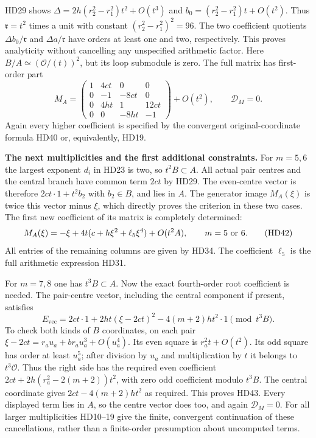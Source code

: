 HD29 shows $\Delta=2h(r_2^2-r_1^2)t^2+O(t^3)$ and
$b_0=(r_2^2-r_1^2)t+O(t^2)$.
Thus $\mathfrak r=t^2$ times a unit with constant
$(r_2^2-r_1^2)^2=96$. The two coefficient quotients
$\Delta b_0/\mathfrak r$ and $\Delta a/\mathfrak r$ have orders
at least one and two, respectively. This proves analyticity
without cancelling any unspecified arithmetic factor.
Here $B/A\simeq(\mathcal O/(t))^2$, but its loop submodule is zero.
The full matrix has first-order part
\[
 M_A=
 \begin{pmatrix}
 1&4ct&0&0\\
 0&-1&-8ct&0\\
 0&4ht&1&12ct\\
 0&0&-8ht&-1
 \end{pmatrix}
       +O(t^2),\qquad \mathcal D_M=0 .
 \tag{HD41}
\]
Again every higher coefficient is specified by the convergent
original-coordinate formula HD40 or, equivalently, HD19.

\HD\textbf{The next multiplicities and the first additional constraints.}
For $m=5,6$ the largest exponent $d_i$ in HD23 is two, so
$t^2B\subset A$. All actual pair centres and the central branch
have common term $2ct$ by HD29. The even-centre vector is therefore
$2ct\cdot1+t^2b_2$ with $b_2\in B$, and lies in $A$.
The generator image $M_A(\xi)$ is twice this vector minus $\xi$,
which directly proves the criterion in these two cases.
The first new coefficient of its matrix is completely determined:
\[
 M_A(\xi)=-\xi+4t(c+h\xi^2+\ell_5\xi^4)+O(t^2A),
       \qquad m=5\ \hbox{or}\ 6 .
 \tag{HD42}
\]
All entries of the remaining columns are given by HD34.
The coefficient $\ell_5$ is the full arithmetic expression HD31.

For $m=7,8$ one has $t^3B\subset A$. Now the exact fourth-order
root coefficient is needed. The pair-centre vector, including
the central component if present, satisfies
\[
 E_{\mathrm{vec}}=
  2ct\cdot1+
  2ht(\xi-2ct)^2-4(m+2)ht^2\cdot1\pmod{t^3B}.
 \tag{HD43}
\]
To check both kinds of $B$ coordinates, on each pair
$\xi-2ct=r_au_a+b r_au_a^3+O(u_a^4)$.
Its even square is $r_a^2t+O(t^2)$.
Its odd square has order at least $u_a^5$; after division by
$u_a$ and multiplication by $t$ it belongs to $t^3\mathcal O$.
Thus the right side has the required even coefficient
$2ct+2h(r_a^2-2(m+2))t^2$, with zero odd coefficient modulo
$t^3B$. The central coordinate gives
$2ct-4(m+2)ht^2$ as required. This proves HD43.
Every displayed term lies in $A$, so the centre vector does too,
and again $\mathcal D_M=0$.
For all larger multiplicities HD10--19 give the finite, convergent
continuation of these cancellations, rather than a finite-order
presumption about uncomputed terms.


